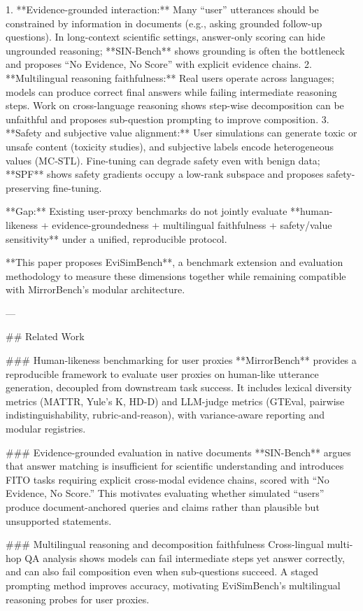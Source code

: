 1. **Evidence-grounded interaction:** Many “user” utterances should be constrained by information in documents (e.g., asking grounded follow-up questions). In long-context scientific settings, answer-only scoring can hide ungrounded reasoning; **SIN-Bench** shows grounding is often the bottleneck and proposes “No Evidence, No Score” with explicit evidence chains.
2. **Multilingual reasoning faithfulness:** Real users operate across languages; models can produce correct final answers while failing intermediate reasoning steps. Work on cross-language reasoning shows step-wise decomposition can be unfaithful and proposes sub-question prompting to improve composition.
3. **Safety and subjective value alignment:** User simulations can generate toxic or unsafe content (toxicity studies), and subjective labels encode heterogeneous values (MC‑STL). Fine-tuning can degrade safety even with benign data; **SPF** shows safety gradients occupy a low-rank subspace and proposes safety-preserving fine-tuning.

**Gap:** Existing user-proxy benchmarks do not jointly evaluate **human-likeness + evidence-groundedness + multilingual faithfulness + safety/value sensitivity** under a unified, reproducible protocol.

**This paper proposes EviSimBench**, a benchmark extension and evaluation methodology to measure these dimensions together while remaining compatible with MirrorBench’s modular architecture.

---

## Related Work  

### Human-likeness benchmarking for user proxies  
**MirrorBench** provides a reproducible framework to evaluate user proxies on human-like utterance generation, decoupled from downstream task success. It includes lexical diversity metrics (MATTR, Yule’s K, HD-D) and LLM-judge metrics (GTEval, pairwise indistinguishability, rubric-and-reason), with variance-aware reporting and modular registries.

### Evidence-grounded evaluation in native documents  
**SIN-Bench** argues that answer matching is insufficient for scientific understanding and introduces FITO tasks requiring explicit cross-modal evidence chains, scored with “No Evidence, No Score.” This motivates evaluating whether simulated “users” produce document-anchored queries and claims rather than plausible but unsupported statements.

### Multilingual reasoning and decomposition faithfulness  
Cross-lingual multi-hop QA analysis shows models can fail intermediate steps yet answer correctly, and can also fail composition even when sub-questions succeed. A staged prompting method improves accuracy, motivating EviSimBench’s multilingual reasoning probes for user proxies.

